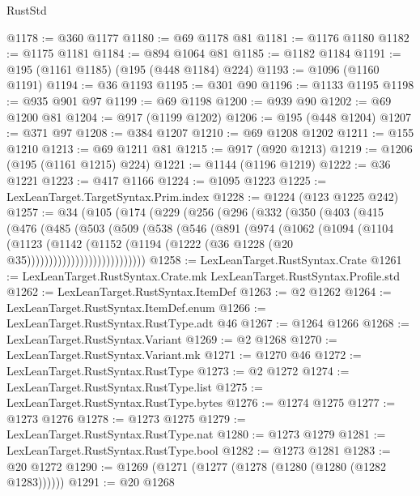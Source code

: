 \begin{lexlean}{RustStd}
\begin{coremodule}
@1178 := @360 @1177
@1180 := @69 @1178 @81
@1181 := @1176 @1180
@1182 := @1175 @1181
@1184 := @894 @1064 @81
@1185 := @1182 @1184
@1191 := @195 (@1161 @1185) (@195 (@448 @1184) @224)
@1193 := @1096 (@1160 @1191)
@1194 := @36 @1193
@1195 := @301 @90
@1196 := @1133 @1195
@1198 := @935 @901 @97
@1199 := @69 @1198
@1200 := @939 @90
@1202 := @69 @1200 @81
@1204 := @917 (@1199 @1202)
@1206 := @195 (@448 @1204)
@1207 := @371 @97
@1208 := @384 @1207
@1210 := @69 @1208 @1202
@1211 := @155 @1210
@1213 := @69 @1211 @81
@1215 := @917 (@920 @1213)
@1219 := @1206 (@195 (@1161 @1215) @224)
@1221 := @1144 (@1196 @1219)
@1222 := @36 @1221
@1223 := @417 @1166
@1224 := @1095 @1223
@1225 := LexLeanTarget.TargetSyntax.Prim.index
@1228 := @1224 (@123 @1225 @242)
@1257 := @34
    (@105
      (@174
        (@229
          (@256
            (@296
              (@332
                (@350
                  (@403
                    (@415
                      (@476
                        (@485
                          (@503
                            (@509
                              (@538
                                (@546
                                  (@891
                                    (@974
                                      (@1062
                                        (@1094
                                          (@1104
                                            (@1123
                                              (@1142
                                                (@1152
                                                  (@1194
                                                    (@1222
                                                      (@36 @1228 (@20 @35)))))))))))))))))))))))))))
@1258 := LexLeanTarget.RustSyntax.Crate
@1261 := LexLeanTarget.RustSyntax.Crate.mk LexLeanTarget.RustSyntax.Profile.std
@1262 := LexLeanTarget.RustSyntax.ItemDef
@1263 := @2 @1262
@1264 := LexLeanTarget.RustSyntax.ItemDef.enum
@1266 := LexLeanTarget.RustSyntax.RustType.adt @46
@1267 := @1264 @1266
@1268 := LexLeanTarget.RustSyntax.Variant
@1269 := @2 @1268
@1270 := LexLeanTarget.RustSyntax.Variant.mk
@1271 := @1270 @46
@1272 := LexLeanTarget.RustSyntax.RustType
@1273 := @2 @1272
@1274 := LexLeanTarget.RustSyntax.RustType.list
@1275 := LexLeanTarget.RustSyntax.RustType.bytes
@1276 := @1274 @1275
@1277 := @1273 @1276
@1278 := @1273 @1275
@1279 := LexLeanTarget.RustSyntax.RustType.nat
@1280 := @1273 @1279
@1281 := LexLeanTarget.RustSyntax.RustType.bool
@1282 := @1273 @1281
@1283 := @20 @1272
@1290 := @1269 (@1271 (@1277 (@1278 (@1280 (@1280 (@1282 @1283))))))
@1291 := @20 @1268

\end{coremodule}
\end{lexlean}
